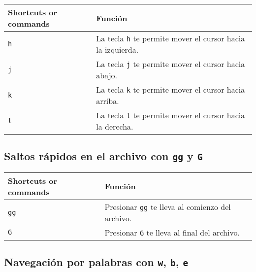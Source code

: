 \documentclass[
  doc,
  floatsintext,
  longtable,
  a4paper,
  nolmodern,
  notxfonts,
  notimes,
  colorlinks=true,linkcolor=blue,citecolor=blue,urlcolor=blue]{apa7}
\begin{document}
\begin{longtable}[]{@{}
  >{\raggedright\arraybackslash}p{}
  >{\raggedright\arraybackslash}p{}@{}}
\toprule\noalign{}
\begin{minipage}[b]{\linewidth}\raggedright
Shortcuts or commands
\end{minipage} & \begin{minipage}[b]{\linewidth}\raggedright
Función
\end{minipage} \\
\midrule\noalign{}
\endhead
\bottomrule\noalign{}
\endlastfoot
\texttt{h} & La tecla \texttt{h} te permite mover el cursor hacia la
izquierda. \\
\texttt{j} & La tecla \texttt{j} te permite mover el cursor hacia
abajo. \\
\texttt{k} & La tecla \texttt{k} te permite mover el cursor hacia
arriba. \\
\texttt{l} & La tecla \texttt{l} te permite mover el cursor hacia la
derecha. \\
\end{longtable}

\subsection{\texorpdfstring{Saltos rápidos en el archivo con \texttt{gg}
y
\texttt{G}}{Saltos rápidos en el archivo con gg y G}}\label{saltos-ruxe1pidos-en-el-archivo-con-gg-y-g}

\begin{longtable}[]{@{}
  >{\raggedright\arraybackslash}p{}
  >{\raggedright\arraybackslash}p{}@{}}
\toprule\noalign{}
\begin{minipage}[b]{\linewidth}\raggedright
Shortcuts or commands
\end{minipage} & \begin{minipage}[b]{\linewidth}\raggedright
Función
\end{minipage} \\
\midrule\noalign{}
\endhead
\bottomrule\noalign{}
\endlastfoot
\texttt{gg} & Presionar \texttt{gg} te lleva al comienzo del archivo. \\
\texttt{G} & Presionar \texttt{G} te lleva al final del archivo. \\
\end{longtable}

\subsection{\texorpdfstring{Navegación por palabras con \texttt{w},
\texttt{b},
\texttt{e}}{Navegación por palabras con w, b, e}}\label{navegaciuxf3n-por-palabras-con-w-b-e}
\end{document}
